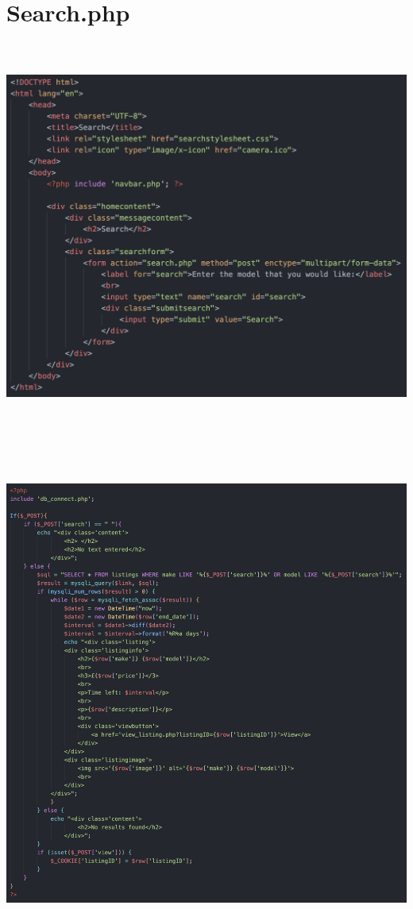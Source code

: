 \section*{Search.php}

\includegraphics[width=6.26806in,height=5.05208in]{ch6_appendix/media/image11.png}

\includegraphics[width=6.26806in,height=6.56667in]{ch6_appendix/media/image12.png}

